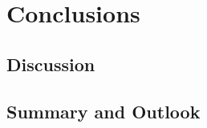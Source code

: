 \chapter{Conclusions}
\label{cha:conclusions}

\section{Discussion}
\label{discussion}

\section{Summary and Outlook}
\label{summary_and_outlook}
